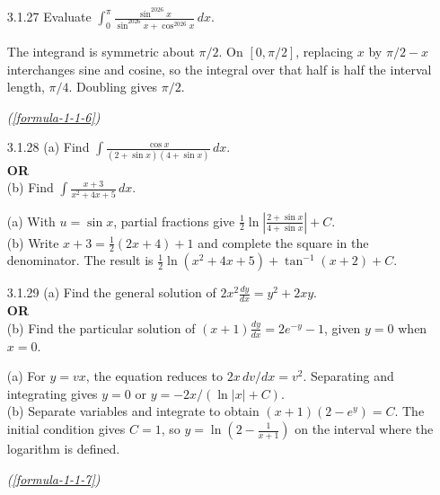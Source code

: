 \begin{enumerate}[label={},font=\normalfont,leftmargin=1.15cm,labelwidth=1.0cm,labelsep=0.15cm,itemindent=0pt,listparindent=0pt,itemsep=\baselineskip,parsep=0pt,topsep=0pt]
(a) Put $x=t^6$. Then the integral becomes $6\int\frac{t^3}{t+1}\,dt$, giving $\boxed{2\sqrt{x}-3x^{1/3}+6x^{1/6}-6\ln(1+x^{1/6})+C}$.\\
(b) Put $x=\cos\theta$. The radical becomes $\tan(\theta/2)$, and integration by parts gives $\boxed{\frac12x\cos^{-1}x-\frac12\sqrt{1-x^2}+C}$ (on the usual interval $-1<x<1$).\par\noindent\hfill\mbox{\textit{(\ref{formula-1-1-5})}}\par

\item[3.1.27] Evaluate $\displaystyle\int_0^\pi\frac{\sin^{2026}x}{\sin^{2026}x+\cos^{2026}x}\,dx$.

\vspace{0.6em}\par\solution


The integrand is symmetric about $\pi/2$. On $[0,\pi/2]$, replacing $x$ by $\pi/2-x$ interchanges sine and cosine, so the integral over that half is half the interval length, $\pi/4$. Doubling gives $\boxed{\pi/2}$.\par\noindent\hfill\mbox{\textit{(\ref{formula-1-1-6})}}\par

\item[3.1.28]
(a) Find $\displaystyle\int\frac{\cos x}{(2+\sin x)(4+\sin x)}\,dx$.\\
\textbf{OR}\\
(b) Find $\displaystyle\int\frac{x+3}{x^2+4x+5}\,dx$.

\vspace{0.6em}\par\solution

(a) With $u=\sin x$, partial fractions give $\boxed{\frac12\ln\left|\frac{2+\sin x}{4+\sin x}\right|+C}$.\\
(b) Write $x+3=\frac12(2x+4)+1$ and complete the square in the denominator. The result is $\boxed{\frac12\ln(x^2+4x+5)+\tan^{-1}(x+2)+C}$.

\item[3.1.29]
(a) Find the general solution of $2x^2\frac{dy}{dx}=y^2+2xy$.\\
\textbf{OR}\\
(b) Find the particular solution of $(x+1)\frac{dy}{dx}=2e^{-y}-1$, given $y=0$ when $x=0$.

\vspace{0.6em}\par\solution


(a) For $y=vx$, the equation reduces to $2x\,dv/dx=v^2$. Separating and integrating gives $\boxed{y=0}$ or $\boxed{y=-2x/(\ln|x|+C)}$.\\
(b) Separate variables and integrate to obtain $(x+1)(2-e^y)=C$. The initial condition gives $C=1$, so $\boxed{y=\ln\!\left(2-\frac1{x+1}\right)}$ on the interval where the logarithm is defined.\par\noindent\hfill\mbox{\textit{(\ref{formula-1-1-7})}}\par


\end{enumerate}
